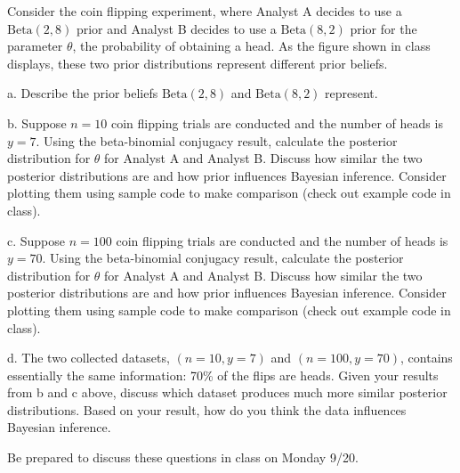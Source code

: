 \documentclass[11pt]{article}
\begin{document}
\begin{enumerate}
Consider the coin flipping experiment, where Analyst A decides to use a $\textrm{Beta}(2, 8)$ prior and Analyst B decides to use a $\textrm{Beta}(8, 2)$ prior for the parameter $\theta$, the probability of obtaining a head. As the figure shown in class displays, these two prior distributions represent different prior beliefs.

a. Describe the prior beliefs $\textrm{Beta}(2, 8)$ and $\textrm{Beta}(8, 2)$ represent.

b. Suppose $n = 10$ coin flipping trials are conducted and the number of heads is $y = 7$. Using the beta-binomial conjugacy result, calculate the posterior distribution for $\theta$ for Analyst A and Analyst B. Discuss how similar the two posterior distributions are and how prior influences Bayesian inference. Consider plotting them using sample code to make comparison (check out example code in class).

c. Suppose $n = 100$ coin flipping trials are conducted and the number of heads is $y = 70$. Using the beta-binomial conjugacy result, calculate the posterior distribution for $\theta$ for Analyst A and Analyst B. Discuss how similar the two posterior distributions are and how prior influences Bayesian inference. Consider plotting them using sample code to make comparison (check out example code in class).

d. The two collected datasets, $(n = 10, y = 7)$ and $(n = 100, y = 70)$, contains essentially the same information: 70\% of the flips are heads. Given your results from b and c above, discuss which dataset produces much more similar posterior distributions. Based on your result, how do you think the data influences Bayesian inference.

\end{enumerate}

Be prepared to discuss these questions in class on Monday 9/20.
\end{document}
